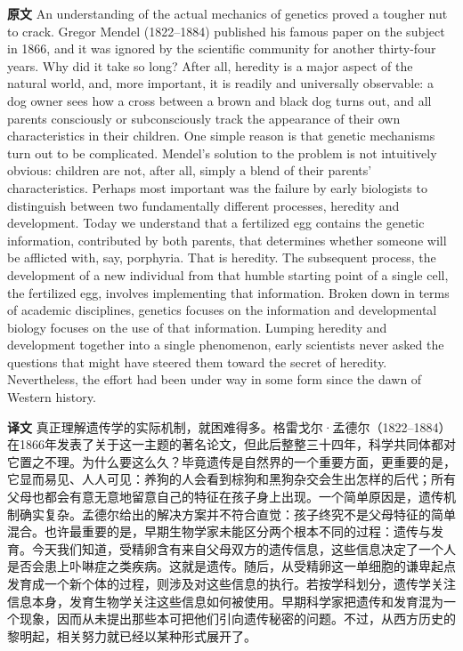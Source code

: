 \documentclass[UTF8,zihao=-4]{ctexart}
\newcommand{\BodyFont}{\fontsize{10.5pt}{15.5pt}\selectfont}
\renewenvironment{quote}{\par\noindent\begingroup\BodyFont}{\par\endgroup}
\begin{document}
\begin{quote}
\noindent\textbf{原文} An understanding of the actual mechanics of genetics proved a tougher nut to crack. Gregor Mendel (1822--1884) published his famous paper on the subject in 1866, and it was ignored by the scientific community for another thirty-four years. Why did it take so long? After all, heredity is a major aspect of the natural world, and, more important, it is readily and universally observable: a dog owner sees how a cross between a brown and black dog turns out, and all parents consciously or subconsciously track the appearance of their own characteristics in their children. One simple reason is that genetic mechanisms turn out to be complicated. Mendel's solution to the problem is not intuitively obvious: children are not, after all, simply a blend of their parents' characteristics. Perhaps most important was the failure by early biologists to distinguish between two fundamentally different processes, heredity and development. Today we understand that a fertilized egg contains the genetic information, contributed by both parents, that determines whether someone will be afflicted with, say, porphyria. That is heredity. The subsequent process, the development of a new individual from that humble starting point of a single cell, the fertilized egg, involves implementing that information. Broken down in terms of academic disciplines, genetics focuses on the information and developmental biology focuses on the use of that information. Lumping heredity and development together into a single phenomenon, early scientists never asked the questions that might have steered them toward the secret of heredity. Nevertheless, the effort had been under way in some form since the dawn of Western history.

\smallskip
\noindent\textbf{译文} 真正理解遗传学的实际机制，就困难得多。格雷戈尔·孟德尔（1822--1884）在1866年发表了关于这一主题的著名论文，但此后整整三十四年，科学共同体都对它置之不理。为什么要这么久？毕竟遗传是自然界的一个重要方面，更重要的是，它显而易见、人人可见：养狗的人会看到棕狗和黑狗杂交会生出怎样的后代；所有父母也都会有意无意地留意自己的特征在孩子身上出现。一个简单原因是，遗传机制确实复杂。孟德尔给出的解决方案并不符合直觉：孩子终究不是父母特征的简单混合。也许最重要的是，早期生物学家未能区分两个根本不同的过程：遗传与发育。今天我们知道，受精卵含有来自父母双方的遗传信息，这些信息决定了一个人是否会患上卟啉症之类疾病。这就是遗传。随后，从受精卵这一单细胞的谦卑起点发育成一个新个体的过程，则涉及对这些信息的执行。若按学科划分，遗传学关注信息本身，发育生物学关注这些信息如何被使用。早期科学家把遗传和发育混为一个现象，因而从未提出那些本可把他们引向遗传秘密的问题。不过，从西方历史的黎明起，相关努力就已经以某种形式展开了。
\end{quote}
\end{document}
